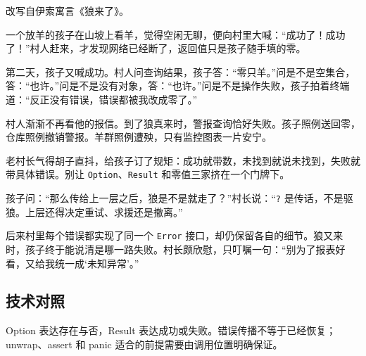改写自伊索寓言《狼来了》。

一个放羊的孩子在山坡上看羊，觉得空闲无聊，便向村里大喊：“成功了！成功了！”村人赶来，才发现网络已经断了，返回值只是孩子随手填的零。

第二天，孩子又喊成功。村人问查询结果，孩子答：“零只羊。”问是不是空集合，答：“也许。”问是不是没有对象，答：“也许。”问是不是操作失败，孩子拍着终端道：“反正没有错误，错误都被我改成零了。”

村人渐渐不再看他的报信。到了狼真来时，警报查询恰好失败。孩子照例送回零，仓库照例撤销警报。羊群照例遭殃，只有监控图表一片安宁。

老村长气得胡子直抖，给孩子订了规矩：成功就带数，未找到就说未找到，失败就带具体错误。别让 \texttt{Option}、\texttt{Result} 和零值三家挤在一个门牌下。

孩子问：“那么传给上一层之后，狼是不是就走了？”村长说：“\texttt{?} 是传话，不是驱狼。上层还得决定重试、求援还是撤离。”

后来村里每个错误都实现了同一个 \texttt{Error} 接口，却仍保留各自的细节。狼又来时，孩子终于能说清是哪一路失败。村长颇欣慰，只叮嘱一句：“别为了报表好看，又给我统一成‘未知异常’。”

\subsection*{技术对照}

Option 表达存在与否，Result 表达成功或失败。错误传播不等于已经恢复；unwrap、assert 和 panic 适合的前提需要由调用位置明确保证。
